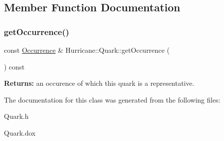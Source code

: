 \subsection{Member Function Documentation}
\mbox{\label{classHurricane_1_1Quark_a22ee192574dae1546ec17d6c549b2ca0}} 
\subsubsection{\texorpdfstring{get\+Occurrence()}{getOccurrence()}}
{\footnotesize\ttfamily const \mbox{\hyperlink{classHurricane_1_1Occurrence}{Occurrence}} \& Hurricane\+::\+Quark\+::get\+Occurrence (\begin{DoxyParamCaption}{ }\end{DoxyParamCaption}) const\hspace{0.3cm}{\ttfamily [inline]}}

{\bfseries Returns\+:} an occurence of which this quark is a representative. 

The documentation for this class was generated from the following files\+:\begin{DoxyCompactItemize}
\item 
Quark.\+h\item 
Quark.\+dox\end{DoxyCompactItemize}
